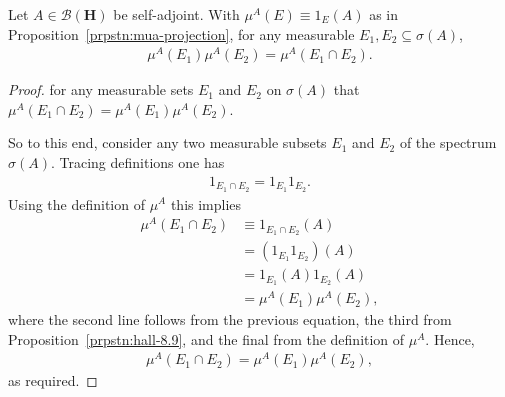 \begin{proposition}
    \label{prpstn:mua-multiplicative}
    \leanok
    Let $A \in \mathcal{B}(\mathbf{H})$ be self-adjoint. With $\mu^A(E) \equiv 1_E(A)$ as in Proposition~\ref{prpstn:mua-projection}, for any measurable $E_1, E_2 \subseteq \sigma(A)$,
    \begin{align}
        \mu^A(E_1)\mu^A(E_2) = \mu^A(E_1 \cap E_2).
    \end{align}
\end{proposition}
\begin{proof}
    \leanok
for any measurable sets $E_1$ and $E_2$ on $\sigma(A)$ that $\mu^A(E_1 \cap E_2) = \mu^A(E_1) \mu^A(E_2)$.

So to this end, consider any two measurable subsets $E_1$ and $E_2$ of the spectrum $\sigma(A)$. Tracing definitions one has
\begin{align}
    1_{E_1 \cap E_2} = 1_{E_1} 1_{E_2}.
\end{align}
Using the definition of $\mu^A$ this implies
\begin{align}
    \mu^A(E_1 \cap E_2) &\equiv 1_{E_1 \cap E_2}(A) \\
                         &=      (1_{E_1} 1_{E_2})(A) \\
                         &=      1_{E_1}(A) 1_{E_2}(A) \\
                         &=      \mu^A(E_1) \mu^A(E_2),
\end{align}
where the second line follows from the previous equation, the third from Proposition~\ref{prpstn:hall-8.9}, and the final from the definition of $\mu^A$. Hence,
\begin{align}
    \mu^A(E_1 \cap E_2) = \mu^A(E_1) \mu^A(E_2),
\end{align}
as required.
\end{proof}

